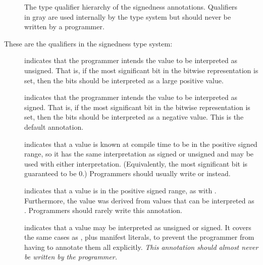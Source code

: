 \begin{figure}
\caption{The type qualifier hierarchy of the signedness annotations.
Qualifiers in gray are used internally by the type system but should never be written by a programmer.}
\label{fig-signedness-hierarchy}
\end{figure}

These are the qualifiers in the signedness type system:

\begin{description}

\item[]
    indicates that the programmer intends the value to be
    interpreted as unsigned.
    That is, if the most significant bit in the bitwise representation is
    set, then the bits should be interpreted as a large positive value.

\item[]
    indicates that the programmer intends the value to be
    interpreted as signed.
    That is, if the most significant bit in the bitwise representation is
    set, then the bits should be interpreted as a negative value.
    This is the default annotation.

\item[]
    indicates that a value is known at compile time to be in the positive
    signed range, so it has the same interpretation as signed or unsigned
    and may be used with either interpretation.  (Equivalently, the most
    significant bit is guaranteed to be 0.)  Programmers should usually
    write  or
     instead.

\item[]
    indicates that a value is in the positive signed range, as with
    .  Furthermore,
    the value was derived from values that can be interpreted as
    .  Programmers should
    rarely write this annotation.

\item[]
    indicates that a value may be interpreted as unsigned or signed.  It
    covers the same cases as
    , plus manifest literals, to
    prevent the programmer from having to annotate them all explicitly.
    \emph{This annotation should almost never be written by the
    programmer.}


\end{description}
